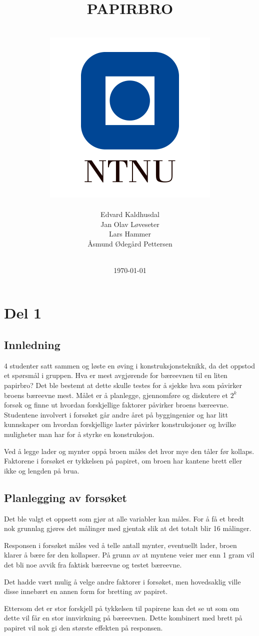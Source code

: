\documentclass[12pt]{article}
\author{\\\includegraphics[scale=0.8]{ntnu-logo.jpg}
		\\\\Edvard Kaldhusdal
		\\Jan Olav Løveseter
		\\Lars Hammer
		\\Åsmund Ødegård Pettersen\\
		\\}
\title{PAPIRBRO}
\date{\today}
\begin{document}
\begin{titlingpage}
\maketitle
\end{titlingpage}

\thispagestyle{empty}
\pagebreak
\tableofcontents
\thispagestyle{empty}
\pagebreak
\clearpage
{}

 
\section{Del 1}
\subsection{Innledning}
4 studenter satt sammen og løste en øving i konstruksjonsteknikk, da det oppstod et spørsmål i gruppen. Hva er mest avgjørende for bæreevnen til en liten papirbro? Det ble bestemt at dette skulle testes for å sjekke hva som påvirker broens bæreevne mest. Målet er å planlegge, gjennomføre og diskutere et $2^k$ forsøk og finne ut hvordan forskjellige faktorer påvirker broens bæreevne. Studentene involvert i forsøket går andre året på byggingeniør og har litt kunnskaper om hvordan forskjellige laster påvirker konstruksjoner og hvilke muligheter man har for å styrke en konstruksjon. 

Ved å legge lader og mynter oppå broen måles det hvor mye den tåler før kollaps. Faktorene i forsøket er tykkelsen på papiret, om broen har kantene brett eller ikke og lengden på brua.


\pagebreak
\subsection{Planlegging av forsøket}
Det ble valgt et oppsett som gjør at alle variabler kan måles. For å få et bredt nok grunnlag gjøres det målinger med gjentak slik at det totalt blir 16 målinger.

Responsen i forsøket måles ved å telle antall mynter, eventuellt lader, broen klarer å bære før den kollapser. På grunn av at myntene veier mer enn 1 gram vil det bli noe avvik fra faktisk bæreevne og testet bæreevne.

Det hadde vært mulig å velge andre faktorer i forsøket, men hovedsaklig ville disse innebært en annen form for bretting av papiret.

Ettersom det er stor forskjell på tykkelsen til papirene kan det se ut som om dette vil får en stor innvirkning på bæreevnen. Dette kombinert med brett på papiret vil nok gi den største effekten på responsen.
\end{document}
